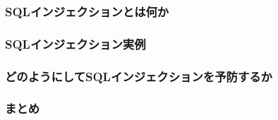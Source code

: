 \subsubsection{SQLインジェクションとは何か}

\subsubsection{SQLインジェクション実例}

\subsubsection{どのようにしてSQLインジェクションを予防するか}

\subsubsection{まとめ}

